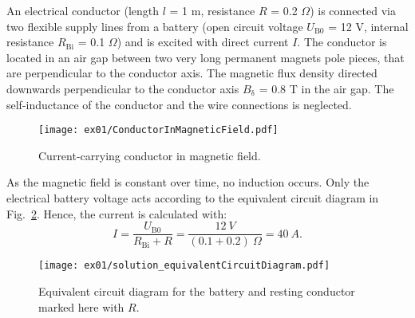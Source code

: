 

An electrical conductor (length $l$ = 1 m, resistance $R$ = 0.2 $\Omega$) is connected via two flexible supply lines from a battery (open circuit voltage $U_{\mathrm{B0}}$ = 12 V, internal resistance $R_{\mathrm{Bi}}$ = 0.1 $\Omega$) and is excited with direct current $I$. The conductor is located in an air gap between two very long permanent magnets pole pieces, that are perpendicular to the conductor axis.
The magnetic flux density directed downwards perpendicular to the conductor axis $B_{\mathrm{\updelta}}$ = 0.8 T in the air gap. The self-inductance of the conductor and the wire connections is neglected.

\begin{figure}[htb]
    \centering
    \texttt{[image: ex01/ConductorInMagneticField.pdf]}
    \caption{Current-carrying conductor in magnetic field.}
    \label{fig:ConductorInMagneticField}
\end{figure}



\begin{solutionblock}
    As the magnetic field is constant over time, no induction occurs. Only the electrical battery voltage acts according to the equivalent circuit diagram in Fig.~\ref{fig:solution_EquivalentCircuitDiagram}. Hence, the current is calculated with:
    \begin{equation}
        I = \frac{U_{\mathrm{B0}}}{R_{\mathrm{Bi}}+R}
        = \frac{12 \ \si{V}}{(0.1+0.2) \ \si{\Omega}}
        = 40 \ \si{A}.
    \end{equation}

    \begin{figure}[ht]
        \centering
        \texttt{[image: ex01/solution\_equivalentCircuitDiagram.pdf]}
        \caption{Equivalent circuit diagram for the battery and resting conductor marked here with $R$.}
        \label{fig:solution_EquivalentCircuitDiagram}
    \end{figure}

\end{solutionblock}



